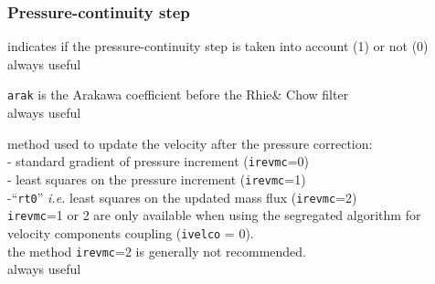 \subsubsection{Pressure-continuity step}


{indicates if the pressure-continuity step is taken into account (1) or
not (0)\\
always useful}

{{\tt arak} is the Arakawa coefficient before the
Rhie\& Chow filter\\
always useful}

{method used to update the velocity after the pressure
correction:\\
\hspace*{0,5cm}- standard gradient of pressure increment
({\tt irevmc}=0)\\
\hspace*{0,5cm}- least squares on the pressure increment
({\tt irevmc}=1)\\
\hspace*{0,5cm}-``{\tt rt0}'' {\em i.e.} least squares on the updated mass flux
({\tt irevmc}=2)\\
{\tt irevmc}=1 or 2 are only available when using the segregated algorithm for velocity components coupling ({\tt ivelco} = 0).\\
the method {\tt irevmc}=2 is generally not recommended.\\
always useful}

